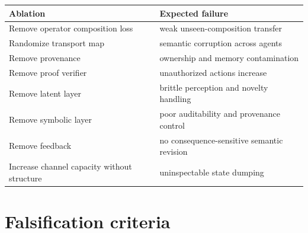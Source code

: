 \documentclass[11pt]{article}
\theoremstyle{definition}
\theoremstyle{remark}
\begin{document}
\begin{center}
\begin{tabular}{ll}
\toprule
Ablation & Expected failure \\
\midrule
Remove operator composition loss & weak unseen-composition transfer \\
Randomize transport map & semantic corruption across agents \\
Remove provenance & ownership and memory contamination \\
Remove proof verifier & unauthorized actions increase \\
Remove latent layer & brittle perception and novelty handling \\
Remove symbolic layer & poor auditability and provenance control \\
Remove feedback & no consequence-sensitive semantic revision \\
Increase channel capacity without structure & uninspectable state dumping \\
\bottomrule
\end{tabular}
\end{center}

\section{Falsification criteria}
\end{document}

